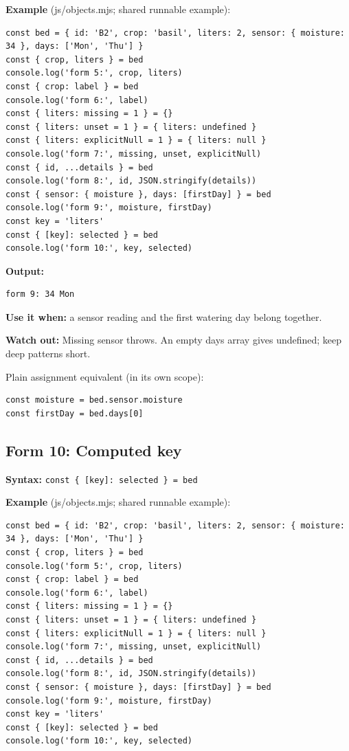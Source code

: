 \documentclass[
  10pt,
  a4paper,
]{article}
\begin{document}
\textbf{Example} (js/objects.mjs; shared runnable example):

\begin{lstlisting}
const bed = { id: 'B2', crop: 'basil', liters: 2, sensor: { moisture: 34 }, days: ['Mon', 'Thu'] }
const { crop, liters } = bed
console.log('form 5:', crop, liters)
const { crop: label } = bed
console.log('form 6:', label)
const { liters: missing = 1 } = {}
const { liters: unset = 1 } = { liters: undefined }
const { liters: explicitNull = 1 } = { liters: null }
console.log('form 7:', missing, unset, explicitNull)
const { id, ...details } = bed
console.log('form 8:', id, JSON.stringify(details))
const { sensor: { moisture }, days: [firstDay] } = bed
console.log('form 9:', moisture, firstDay)
const key = 'liters'
const { [key]: selected } = bed
console.log('form 10:', key, selected)
\end{lstlisting}

\textbf{Output:}

\begin{lstlisting}
form 9: 34 Mon
\end{lstlisting}

\textbf{Use it when:} a sensor reading and the first watering day belong
together.

\textbf{Watch out:} Missing sensor throws. An empty days array gives
undefined; keep deep patterns short.

Plain assignment equivalent (in its own scope):

\begin{lstlisting}
const moisture = bed.sensor.moisture
const firstDay = bed.days[0]
\end{lstlisting}

\subsection{Form 10: Computed key}\label{form-10-computed-key}

\textbf{Syntax:}
\texttt{const \{ [key]:\allowbreak{} selected \} =\allowbreak{} bed}

\textbf{Example} (js/objects.mjs; shared runnable example):

\begin{lstlisting}
const bed = { id: 'B2', crop: 'basil', liters: 2, sensor: { moisture: 34 }, days: ['Mon', 'Thu'] }
const { crop, liters } = bed
console.log('form 5:', crop, liters)
const { crop: label } = bed
console.log('form 6:', label)
const { liters: missing = 1 } = {}
const { liters: unset = 1 } = { liters: undefined }
const { liters: explicitNull = 1 } = { liters: null }
console.log('form 7:', missing, unset, explicitNull)
const { id, ...details } = bed
console.log('form 8:', id, JSON.stringify(details))
const { sensor: { moisture }, days: [firstDay] } = bed
console.log('form 9:', moisture, firstDay)
const key = 'liters'
const { [key]: selected } = bed
console.log('form 10:', key, selected)
\end{lstlisting}
\end{document}
